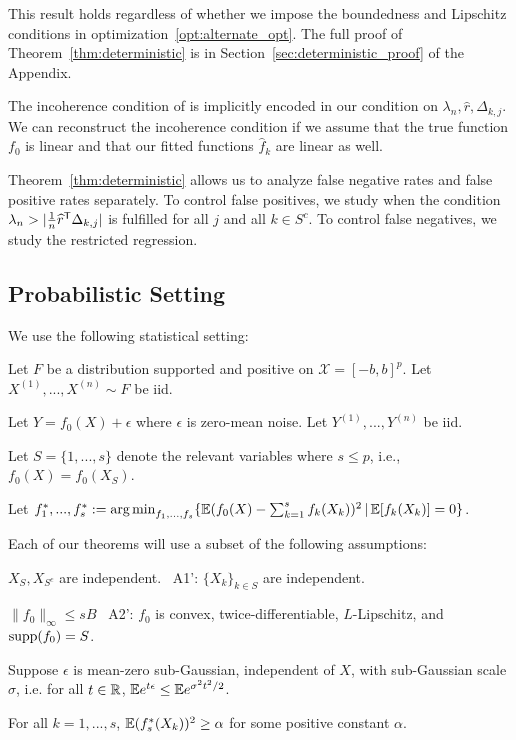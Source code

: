 This result holds regardless of whether we impose the boundedness and Lipschitz conditions in optimization~\ref{opt:alternate_opt}.
The full proof of Theorem~\ref{thm:deterministic} is in Section~\ref{sec:deterministic_proof} of the Appendix.

\begin{remark}
  The incoherence condition of \cite{Wain:09a} is implicitly encoded
  in our condition on $\lambda_n, \hat{r}, \Delta_{k,j}$. We can
  reconstruct the incoherence condition if we assume that the true
  function $f_0$ is linear and that our fitted functions $\hat{f}_k$
  are linear as well.
\end{remark}

Theorem~\ref{thm:deterministic} allows us to analyze false negative
rates and false positive rates separately. To control false positives,
we study when the condition $\lambda_n > | \frac{1}{n} \widehat{r}^{\mathsf{T}}
\Delta_{k,j}|$ is fulfilled for all $j$ and all $k \in S^c$. To
control false negatives, we study the restricted regression.

\subsection{Probabilistic Setting}

We use the following statistical setting:

\begin{packed_enum}
\item Let $F$ be a distribution supported and positive on $\mathcal{X}=[-b,b]^p$. Let $X^{(1)},..., X^{(n)} \sim F$ be iid.
\item Let $Y = f_0(X) + \epsilon$ where $\epsilon$ is zero-mean noise. Let $Y^{(1)},...,Y^{(n)}$ be iid.
\item Let $S = \{1,...,s\}$ denote the relevant variables where $s\leq p$, i.e.,
  $f_0(X) = f_0(X_S)$.
\item Let $f^*_1,...,f^*_s := \mathop{\text{\rm arg\,min}}_{f_1,...,f_s} \{ {\mathbb E}(f_0(X) - \sum_{k=1}^s f_k(X_k))^2 \,|\, {\mathbb E}[f_k(X_k)] = 0 \}$.
\end{packed_enum}

Each of our theorems will use a subset of the following assumptions:
\begin{packed_enum}
\item[A1:] $X_S, X_{S^c}$ are independent.  \ A1': $\{ X_k \}_{k \in S}$ are independent.
\item[A2:] $\|f_0\|_\infty \leq sB$ \  A2': $f_0$ is convex,
  twice-differentiable, $L$-Lipschitz, and $\textrm{supp}(f_0) = S$.
\item[A3:] Suppose $\epsilon$ is mean-zero sub-Gaussian, independent of $X$, with sub-Gaussian scale $\sigma$, i.e. for all $t \in \mathbb{R}$, ${\mathbb E} e^{t \epsilon} \leq {\mathbb E} e^{\sigma^2 t^2 / 2}$.
\item[A4:] For all $k=1,...,s$, ${\mathbb E}(f^*_s(X_k))^2 \geq \alpha$ for some positive constant $\alpha$.
\end{packed_enum}

